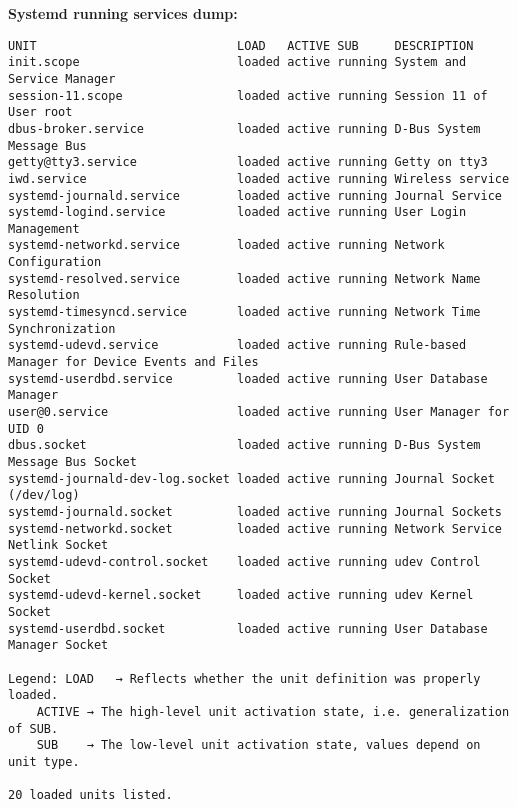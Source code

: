 \textbf{Systemd running services dump:}
\begin{verbatim}
UNIT                            LOAD   ACTIVE SUB     DESCRIPTION
init.scope                      loaded active running System and Service Manager
session-11.scope                loaded active running Session 11 of User root
dbus-broker.service             loaded active running D-Bus System Message Bus
getty@tty3.service              loaded active running Getty on tty3
iwd.service                     loaded active running Wireless service
systemd-journald.service        loaded active running Journal Service
systemd-logind.service          loaded active running User Login Management
systemd-networkd.service        loaded active running Network Configuration
systemd-resolved.service        loaded active running Network Name Resolution
systemd-timesyncd.service       loaded active running Network Time Synchronization
systemd-udevd.service           loaded active running Rule-based Manager for Device Events and Files
systemd-userdbd.service         loaded active running User Database Manager
user@0.service                  loaded active running User Manager for UID 0
dbus.socket                     loaded active running D-Bus System Message Bus Socket
systemd-journald-dev-log.socket loaded active running Journal Socket (/dev/log)
systemd-journald.socket         loaded active running Journal Sockets
systemd-networkd.socket         loaded active running Network Service Netlink Socket
systemd-udevd-control.socket    loaded active running udev Control Socket
systemd-udevd-kernel.socket     loaded active running udev Kernel Socket
systemd-userdbd.socket          loaded active running User Database Manager Socket

Legend: LOAD   → Reflects whether the unit definition was properly loaded.
    ACTIVE → The high-level unit activation state, i.e. generalization of SUB.
    SUB    → The low-level unit activation state, values depend on unit type.

20 loaded units listed.
\end{verbatim}

